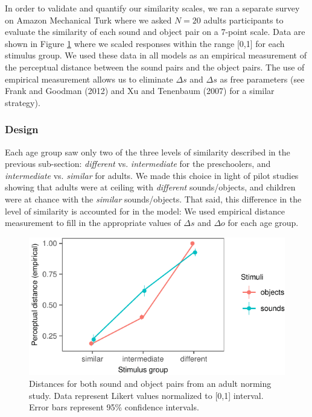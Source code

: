 \documentclass[english,,man,floatsintext]{apa6}
\theoremstyle{definition}
\theoremstyle{definition}
\theoremstyle{definition}
\theoremstyle{remark}
\begin{document}
In order to validate and quantify our similarity scales, we ran a
separate survey on Amazon Mechanical Turk where we asked \(N=20\) adults
participants to evaluate the similarity of each sound and object pair on
a 7-point scale. Data are shown in Figure \ref{fig:stim} where we scaled
responses within the range {[}0,1{]} for each stimulus group. We used
these data in all models as an empirical measurement of the perceptual
distance between the sound pairs and the object pairs. The use of
empirical measurement allows us to eliminate \(\Delta s\) and
\(\Delta s\) as free parameters (see Frank and Goodman (2012) and Xu and
Tenenbaum (2007) for a similar strategy).

\subsubsection{Design}\label{design}

Each age group saw only two of the three levels of similarity described
in the previous sub-section: \emph{different} vs. \emph{intermediate}
for the preschoolers, and \emph{intermediate} vs. \emph{similar} for
adults. We made this choice in light of pilot studies showing that
adults were at ceiling with \emph{different} sounds/objects, and
children were at chance with the \emph{similar} sounds/objects. That
said, this difference in the level of similarity is accounted for in the
model: We used empirical distance measurement to fill in the appropriate
values of \(\Delta s\) and \(\Delta o\) for each age group.

\begin{figure}[h]

{\centering \includegraphics{ms_full_files/figure-latex/stim-1} 

}

\caption{Distances for both sound and object pairs from an adult norming study. Data represent Likert values normalized to [0,1] interval. Error bars represent 95\% confidence intervals.}\label{fig:stim}
\end{figure}
\end{document}
